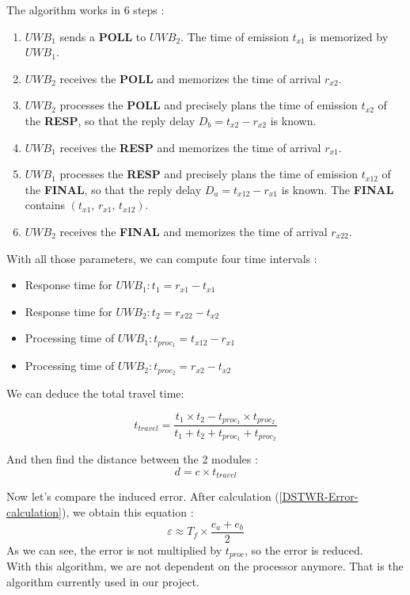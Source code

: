 \noindent The algorithm works in 6 steps :  
\begin{enumerate}
    \item $UWB_1$ sends a \textbf{POLL} to $UWB_2$. The time of emission
          $t_{x1}$ is memorized by $UWB_1$.
    \item $UWB_2$ receives the \textbf{POLL} and memorizes the time of
          arrival $r_{x2}$.
    \item $UWB_2$ processes the \textbf{POLL} and precisely plans the time
          of emission $t_{x2}$ of the \textbf{RESP}, so that the reply
          delay $D_b = t_{x2} - r_{x2}$ is known.
    \item $UWB_1$ receives the \textbf{RESP} and memorizes the time of
          arrival $r_{x1}$.
    \item $UWB_1$ processes the \textbf{RESP} and precisely plans the time
          of emission $t_{x12}$ of the \textbf{FINAL}, so that the reply
          delay $D_a = t_{x12} - r_{x1}$ is known. The \textbf{FINAL}
          contains $(t_{x1},\, r_{x1},\, t_{x12})$.
    \item $UWB_2$ receives the \textbf{FINAL} and memorizes the time of
          arrival $r_{x22}$.
\end{enumerate}

\noindent With all those parameters, we can compute four time intervals :
\begin{itemize}
    \item Response time for $UWB_1 : t_1 = r_{x1} - t_{x1}$
    \item Response time for $UWB_2 : t_2 = r_{x22} - t_{x2}$
    \item Processing time of $UWB_1 : t_{proc_1} = t_{x12} - r_{x1}$
    \item Processing time of $UWB_2 : t_{proc_2} = r_{x2} - t_{x2}$
\end{itemize}

\noindent We can deduce the total travel time: 

\begin{equation}
\boxed{t_{travel} = \frac{t_1 \times t_2 - t_{proc_1} \times t_{proc_2}}{ t_1 +t_2+t_{proc_1}+t_{proc_2}}}
\end{equation}

\noindent And then find the distance between the 2 modules : 
 \begin{equation}
    d = c \times t_{travel}
\end{equation}         

\noindent Now let's compare the induced error. After calculation (\ref{DSTWR-Error-calculation}), we obtain this equation  : 
\begin{equation}
\varepsilon \approx T_f \times \frac{e_a + e_b}{2}
\end{equation}
As we can see, the error is not multiplied by $t_{proc}$, so the error is reduced.\\
With this algorithm, we are not dependent on the processor anymore. That is the algorithm currently used in our project.

